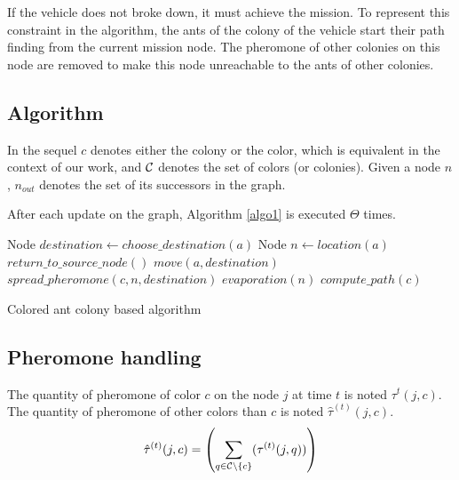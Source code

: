 \documentclass[review]{elsarticle}
\begin{document}
If the vehicle does not broke down, it must achieve the mission. To represent this constraint in the algorithm, the ants of the colony of the vehicle start their path finding from the current mission node. The pheromone of other colonies on this node are removed to make this node unreachable to the ants of other colonies.




\subsection{Algorithm}

In the sequel $c$ denotes either the colony or the color, which is equivalent in the context of our work, and $\cal{C}$ denotes the set of colors (or colonies). Given a node $n$, $n_{out}$ denotes the set of its successors in the graph. 

After each update on the graph, Algorithm \ref{algo1} is executed $\Theta$ times.


\begin{algorithm}[h]
\begin{algorithmic} 

\STATE Node $destination \leftarrow choose\_destination(a)$
\STATE Node $n \leftarrow location(a)$
\STATE $return\_to\_source\_node()$
\ELSE
\STATE $move(a, destination)$
\STATE $spread\_pheromone(c, n, destination)$
\ENDIF
\ENDFOR
{}
\STATE $evaporation(n)$
\ENDFOR
{}
\STATE $compute\_path(c)$
\ENDFOR
\end{algorithmic}
\caption{Colored ant colony based algorithm}
\label{algo1}
\end{algorithm}

\subsection{Pheromone handling}

The quantity of pheromone of color $c$ on the node $j$ at time $t$ is noted $\tau^{t}(j,c)$. The quantity of pheromone of other colors than $c$ is noted $\hat \tau^{(t)}(j,c)$.
\begin{equation*}
    \hat \tau^{(t)}(j,c) = \left( \sum_{q \in {\cal{C}} \backslash \{c\}}(\tau^{(t)} (j,q)) \right)
\end{equation*}
\end{document}
